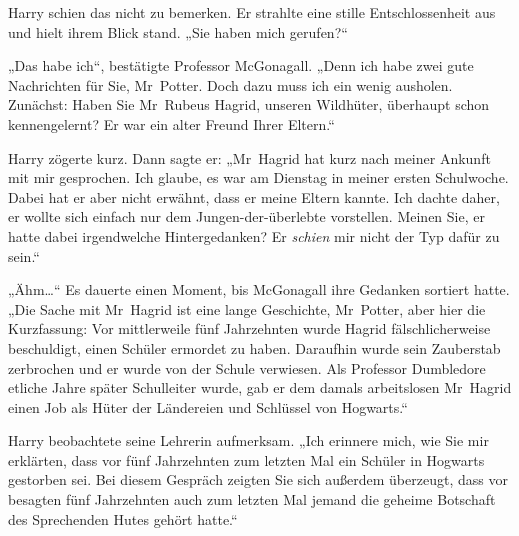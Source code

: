 Harry schien das nicht zu bemerken. Er strahlte eine stille Entschlossenheit aus und hielt ihrem Blick stand. „Sie haben mich gerufen?“

„Das habe ich“, bestätigte Professor McGonagall. „Denn ich habe zwei gute Nachrichten für Sie, Mr~Potter. Doch dazu muss ich ein wenig ausholen. Zunächst: Haben Sie Mr~Rubeus Hagrid, unseren Wildhüter, überhaupt schon kennengelernt? Er war ein alter Freund Ihrer Eltern.“

Harry zögerte kurz. Dann sagte er: „Mr~Hagrid hat kurz nach meiner Ankunft mit mir gesprochen. Ich glaube, es war am Dienstag in meiner ersten Schulwoche. Dabei hat er aber nicht erwähnt, dass er meine Eltern kannte. Ich dachte daher, er wollte sich einfach nur dem Jungen-der-überlebte vorstellen. Meinen Sie, er hatte dabei irgendwelche Hintergedanken? Er \emph{schien} mir nicht der Typ dafür zu sein.“

„Ähm…“ Es dauerte einen Moment, bis McGonagall ihre Gedanken sortiert hatte. „Die Sache mit Mr~Hagrid ist eine lange Geschichte, Mr~Potter, aber hier die Kurzfassung: Vor mittlerweile fünf Jahrzehnten wurde Hagrid fälschlicherweise beschuldigt, einen Schüler ermordet zu haben. Daraufhin wurde sein Zauberstab zerbrochen und er wurde von der Schule verwiesen. Als Professor Dumbledore etliche Jahre später Schulleiter wurde, gab er dem damals arbeitslosen Mr~Hagrid einen Job als Hüter der Ländereien und Schlüssel von Hogwarts.“

Harry beobachtete seine Lehrerin aufmerksam. „Ich erinnere mich, wie Sie mir erklärten, dass vor fünf Jahrzehnten zum letzten Mal ein Schüler in Hogwarts gestorben sei. Bei diesem Gespräch zeigten Sie sich außerdem überzeugt, dass vor besagten fünf Jahrzehnten auch zum letzten Mal jemand die geheime Botschaft des Sprechenden Hutes gehört hatte.“

